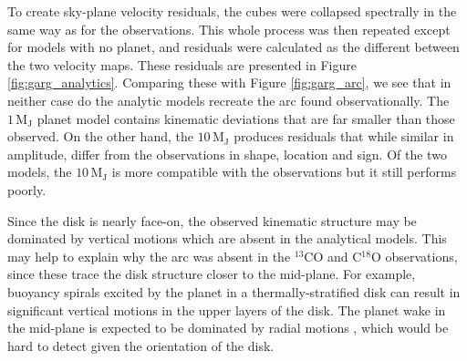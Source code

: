 To create sky-plane velocity residuals, the cubes were collapsed spectrally in the same way as for the observations.
This whole process was then repeated except for models with no planet, and residuals were calculated as the different between the two velocity maps.
These residuals are presented in Figure \ref{fig:garg_analytics}.
Comparing these with Figure \ref{fig:garg_arc}, we see that in neither case do the analytic models recreate the arc found observationally.
The $1 \, \mathrm{M_J}$ planet model contains kinematic deviations that are far smaller than those observed.
On the other hand, the $10 \, \mathrm{M_J}$ produces residuals that while similar in amplitude, differ from the observations in shape, location and sign.
Of the two models, the $10 \, \mathrm{M_J}$ is more compatible with the observations but it still performs poorly.

Since the disk is nearly face-on, the observed kinematic structure may be dominated by vertical motions which are absent in the analytical models.
This may help to explain why the arc was absent in the $^{13}$CO and C$^{18}$O observations, since these trace the disk structure closer to the mid-plane.
For example, buoyancy spirals \citep{zhu2012,bae2021} excited by the planet in a thermally-stratified disk can result in significant vertical motions in the upper layers of the disk.
The planet wake in the mid-plane is expected to be dominated by radial motions \citep{rafikov2002a}, which would be hard to detect given the orientation of the disk.

